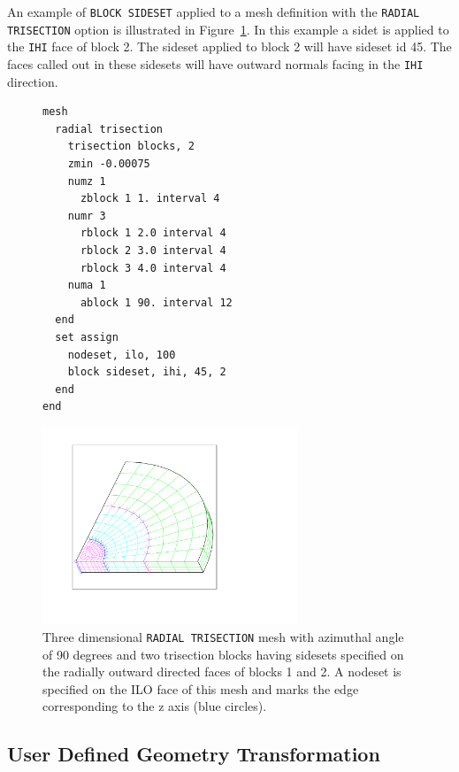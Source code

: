 An example of \texttt{BLOCK SIDESET} applied to a mesh definition with the
\texttt{RADIAL TRISECTION} option is illustrated in
Figure~\ref{fig:block_ss}. In this example a sidet is applied to the
\texttt{IHI} face of block 2. The sideset applied to block 2 will
have sideset id 45. The faces called out in these sidesets will have
outward normals facing in the \texttt{IHI} direction.

\begin{figure}[htbp]
\centering
  \begin{minipage}[c]{0.4\linewidth}
    \centering
{\ttfamily \begin{verbatim}
mesh
  radial trisection
    trisection blocks, 2
    zmin -0.00075
    numz 1
      zblock 1 1. interval 4
    numr 3
      rblock 1 2.0 interval 4
      rblock 2 3.0 interval 4
      rblock 3 4.0 interval 4
    numa 1
      ablock 1 90. interval 12
  end
  set assign
    nodeset, ilo, 100
    block sideset, ihi, 45, 2
  end
end
\end{verbatim}}
  \end{minipage}%
  \hfil
  \begin{minipage}[c]{0.6\linewidth}
    \centering
      \includegraphics[width=3.0in]{figures/block_ss}
  \end{minipage}
  \caption [A \texttt{RADIAL TRISECTION} mesh with sidesets.] {Three dimensional \texttt{RADIAL TRISECTION} mesh with azimuthal
    angle of 90 degrees and two trisection blocks having sidesets
    specified on the radially outward directed faces of blocks 1 and 2. A nodeset is specified on the \textsc{ILO} face of this mesh and marks the edge corresponding to the z axis (blue circles).}
  \label{fig:block_ss}
\end{figure}

\clearpage
\subsection{User Defined Geometry Transformation}
\label{sec:inline-geometry-transform}


